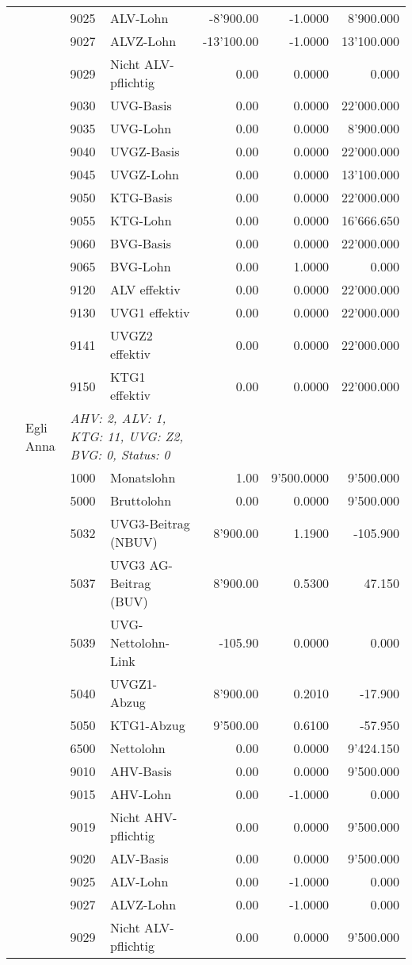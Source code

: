 \documentclass[15pt,a4paper]{article}
\begin{document}
\begin{longtable}{@{\extracolsep{\fill}}l l l l|r|r|r}
&&9025&ALV-Lohn&-8'900.00&-1.0000&8'900.000\\
&&9027&ALVZ-Lohn&-13'100.00&-1.0000&13'100.000\\
&&9029&Nicht ALV-pflichtig&0.00&0.0000&0.000\\
&&9030&UVG-Basis&0.00&0.0000&22'000.000\\
&&9035&UVG-Lohn&0.00&0.0000&8'900.000\\
&&9040&UVGZ-Basis&0.00&0.0000&22'000.000\\
&&9045&UVGZ-Lohn&0.00&0.0000&13'100.000\\
&&9050&KTG-Basis&0.00&0.0000&22'000.000\\
&&9055&KTG-Lohn&0.00&0.0000&16'666.650\\
&&9060&BVG-Basis&0.00&0.0000&22'000.000\\
&&9065&BVG-Lohn&0.00&1.0000&0.000\\
&&9120&ALV effektiv&0.00&0.0000&22'000.000\\
&&9130&UVG1 effektiv&0.00&0.0000&22'000.000\\
&&9141&UVGZ2 effektiv&0.00&0.0000&22'000.000\\
&&9150&KTG1 effektiv&0.00&0.0000&22'000.000\\
\pagebreak
7&Egli Anna&\multicolumn{2}{l|}{\small\emph{AHV: 2, ALV: 1, KTG: 11, UVG: Z2, BVG: 0, Status: 0}}&& \\
&&1000&Monatslohn&1.00&9'500.0000&9'500.000\\
&&5000&Bruttolohn&0.00&0.0000&9'500.000\\
&&5032&UVG3-Beitrag (NBUV)&8'900.00&1.1900&-105.900\\
&&5037&UVG3 AG-Beitrag (BUV)&8'900.00&0.5300&47.150\\
&&5039&UVG-Nettolohn-Link&-105.90&0.0000&0.000\\
&&5040&UVGZ1-Abzug&8'900.00&0.2010&-17.900\\
&&5050&KTG1-Abzug&9'500.00&0.6100&-57.950\\
&&6500&Nettolohn&0.00&0.0000&9'424.150\\
&&9010&AHV-Basis&0.00&0.0000&9'500.000\\
&&9015&AHV-Lohn&0.00&-1.0000&0.000\\
&&9019&Nicht AHV-pflichtig&0.00&0.0000&9'500.000\\
&&9020&ALV-Basis&0.00&0.0000&9'500.000\\
&&9025&ALV-Lohn&0.00&-1.0000&0.000\\
&&9027&ALVZ-Lohn&0.00&-1.0000&0.000\\
&&9029&Nicht ALV-pflichtig&0.00&0.0000&9'500.000\\

\end{longtable}
\end{document}
